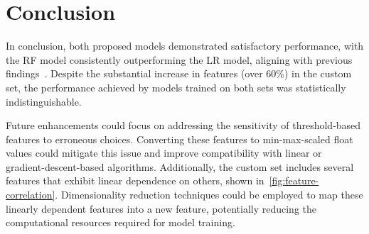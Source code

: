 \section{Conclusion}\label{sec:conclusion}
In conclusion, both proposed models demonstrated satisfactory performance,
with the RF model consistently outperforming the LR model, aligning with
previous findings~\cite{CHIEW2019153, SAHINGOZ2019345}. Despite the substantial
increase in features (over 60\%) in the custom set, the performance achieved
by models trained on both sets was statistically indistinguishable.

Future enhancements could focus on addressing the sensitivity of threshold-based
features to erroneous choices. Converting these features to min-max-scaled float
values could mitigate this issue and improve compatibility with linear or
gradient-descent-based algorithms. Additionally, the custom set includes
several features that exhibit linear dependence on others, shown in~\autoref{fig:feature-correlation}.
Dimensionality reduction techniques could be employed to map these linearly dependent features
into a new feature, potentially reducing the computational resources required
for model training.
